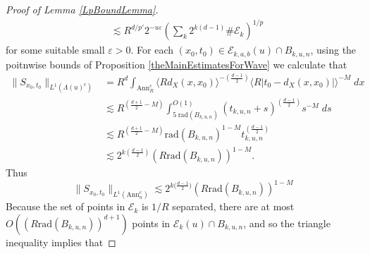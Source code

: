 \begin{proof}[Proof of Lemma \ref{LpBoundLemma}]
\begin{equation}
\begin{split}
    &\lesssim R^{d/p'} 2^{-u \varepsilon} \left( \sum\nolimits_k 2^{k(d-1)} \# \mathcal{E}_k \right)^{1/p}
\end{split}
\end{equation}
%
for some suitable small $\varepsilon > 0$. For each $(x_0,t_0) \in \mathcal{E}_{k,a,b}(u) \cap B_{k,u,n}$, using the poitnwise bounds of Proposition \ref{theMainEstimatesForWave} we calculate that
%
\begin{equation}
\begin{split}
        \| S\!_{x_0,t_0} \|_{L^1(\Lambda(u)^c)} &= R^{d} \int_{\text{Ann}_R^c} \langle R d_X(x,x_0) \rangle^{- \left( \frac{d-1}{2} \right)} \langle R |t_0 - d_X(x,x_0)| \rangle^{-M}\; dx\\
        &\lesssim R^{ \left( \frac{d+1}{2} - M \right)} \int_{5\; \text{rad}(B_{k,u,n})}^{O(1)} ( t_{k,u,n} + s)^{\left( \frac{d-1}{2} \right)} s^{-M}\; ds\\
        &\lesssim R^{ \left( \frac{d+1}{2} - M \right)} \text{rad}(B_{k,u,n})^{1-M} t_{k,u,n}^{\left( \frac{d-1}{2} \right)}\\
        &\lesssim 2^{k \left( \frac{d-1}{2} \right)} (R \text{rad}(B_{k,u,n}))^{1 - M}.
\end{split}
\end{equation}
%
Thus
%
\begin{equation}
    \|  S\!_{x_0,t_0} \|_{L^1(\text{Ann}_n^c)} \lesssim 2^{k \big( \frac{d-1}{2} \big)} (R \text{rad}(B_{k,u,n}))^{1 - M}
\end{equation}
%
%
% 
%
Because the set of points in $\mathcal{E}_k$ is $1/R$ separated, there are at most $O( (R \text{rad}(B_{k,u,n}))^{d+1} )$ points in $\mathcal{E}_k(u) \cap B_{k,u,n}$, and so the triangle inequality implies that

\end{proof}
